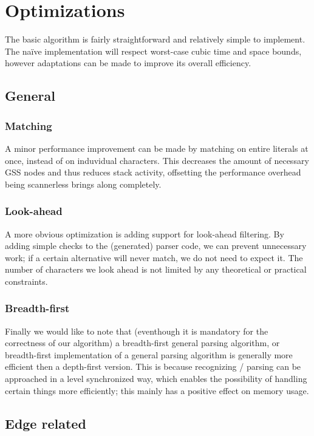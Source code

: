 \documentclass[a4paper,10pt]{article}
\begin{document}
\section{Optimizations}
\label{chap:optimizations}

The basic algorithm is fairly straightforward and relatively simple to implement. The naïve implementation will respect worst-case cubic time and space bounds, however adaptations can be made to improve its overall efficiency.

\subsection{General}

\subsubsection{Matching}
A minor performance improvement can be made by matching on entire literals at once, instead of on induvidual characters. This decreases the amount of necessary GSS nodes and thus reduces stack activity, offsetting the performance overhead being scannerless brings along completely.

\subsubsection{Look-ahead}
A more obvious optimization is adding support for look-ahead filtering. By adding simple checks to the (generated) parser code, we can prevent unnecessary work; if a certain alternative will never match, we do not need to expect it. The number of characters we look ahead is not limited by any theoretical or practical constraints.

\subsubsection{Breadth-first}
Finally we would like to note that (eventhough it is mandatory for the correctness of our algorithm) a breadth-first general parsing algorithm, or breadth-first implementation of a general parsing algorithm is generally more efficient then a depth-first version. This is because recognizing / parsing can be approached in a level synchronized way, which enables the possibility of handling certain things more efficiently; this mainly has a positive effect on memory usage.

\subsection{Edge related}
\label{sec:edgeOptimizations}
\end{document}
